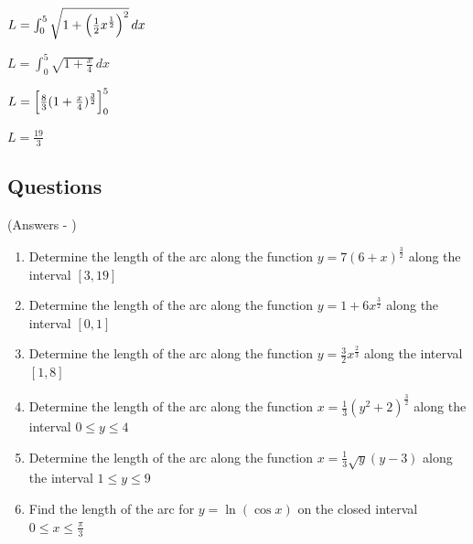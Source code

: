 \documentclass[../main.tex]{subfiles}
\begin{document}
$L=\int_0^5 \sqrt{1+\Bigl(\frac{1}{2}x^{\frac{1}{2}}\Bigr)^2}\,dx$

$L=\int_0^5 \sqrt{1+\frac{x}{4}}\,dx$

$L=\Bigl[\frac{8}{3}(1+\frac{x}{4})^{\frac{3}{2}}\Bigr]_0^5$

$L=\frac{19}{3}$

\pagebreak

\subsection*{Questions}
(Answers - {\pageref{Arc length answers}})
\label{Arc length}
\begin{enumerate}[itemsep=0.7cm]
    \item 
    Determine the length of the arc along the function $y=7(6+x)^{\frac{3}{2}}$ along the interval $[3,19]$

    \item
    Determine the length of the arc along the function $y=1+6x^{\frac{3}{2}}$ along the interval $[0,1]$

    \item 
    Determine the length of the arc along the function $y=\frac{3}{2}x^{\frac{2}{3}}$ along the interval $[1,8]$

    \item 
    Determine the length of the arc along the function $x=\frac{1}{3}(y^2+2)^{\frac{3}{2}}$ along the interval $0\leq y \leq 4$

    \item 
    Determine the length of the arc along the function $x=\frac{1}{3}\sqrt{y}(y-3)$ along the interval $1\leq y \leq 9$

    \item 
    Find the length of the arc for $y=\ln{(\cos{x})}$ on the closed interval $0 \leq x \leq \frac{\pi}{3}$

\end{enumerate}
\end{document}
